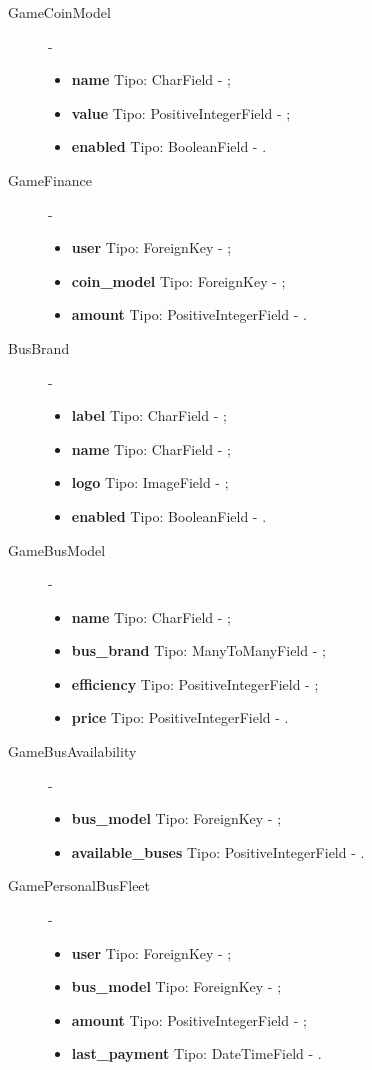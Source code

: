 \begin{description}
    \item[GameCoinModel] - 
        \begin{itemize}
            \item \textbf{name} Tipo: CharField - ;
            \item \textbf{value} Tipo: PositiveIntegerField - ;
            \item \textbf{enabled} Tipo: BooleanField - .
        \end{itemize}
    \item[GameFinance] - 
        \begin{itemize}
            \item \textbf{user} Tipo: ForeignKey - ;
            \item \textbf{coin\_model} Tipo: ForeignKey - ;
            \item \textbf{amount} Tipo: PositiveIntegerField - .
        \end{itemize}
    \item[BusBrand] - 
        \begin{itemize}
            \item \textbf{label} Tipo: CharField - ;
            \item \textbf{name} Tipo: CharField - ;
            \item \textbf{logo} Tipo: ImageField - ;
            \item \textbf{enabled} Tipo: BooleanField - .
        \end{itemize}
    \item[GameBusModel] - 
        \begin{itemize}
            \item \textbf{name} Tipo: CharField - ;
            \item \textbf{bus\_brand} Tipo: ManyToManyField - ;
            \item \textbf{efficiency} Tipo: PositiveIntegerField - ;
            \item \textbf{price} Tipo: PositiveIntegerField - .
        \end{itemize}
    \item[GameBusAvailability] - 
        \begin{itemize}
            \item \textbf{bus\_model} Tipo: ForeignKey - ;
            \item \textbf{available\_buses} Tipo: PositiveIntegerField - .
        \end{itemize}
    \item[GamePersonalBusFleet] - 
        \begin{itemize}
            \item \textbf{user} Tipo: ForeignKey - ;
            \item \textbf{bus\_model} Tipo: ForeignKey - ;
            \item \textbf{amount} Tipo: PositiveIntegerField - ;
            \item \textbf{last\_payment} Tipo: DateTimeField - .
        \end{itemize}
\end{description}
